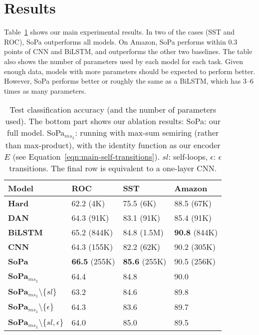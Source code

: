 \documentclass[11pt,a4paper]{article}
\newcommand{\isectionb}[1]{\section{#1}\label{sec:#1}}
\newcommand{\tabref}[1]{Table~\ref{#1}}
\newcommand{\SoftP}{SoPa\xspace}
\newcommand{\Softp}{SoPa}
\begin{document}
\isectionb{Results}



\tabref{tab:results} shows our main experimental results. 
In two of the cases (SST and ROC), \SoftP outperforms all models.
On Amazon, \SoftP performs within 0.3 points of CNN and BiLSTM, and outperforms the other two baselines.
The table also shows the number of parameters used by each model for each task. 
Given enough data, models with more parameters should be expected to perform better.
However, \SoftP performs better or roughly the same as a BiLSTM, which has  $3$--$6$ times as many parameters.

  









\begin{table}[!t]

\setlength{\tabcolsep}{1.7pt}
\small
\centering
\begin{tabularx}{\linewidth}{@{}l X X X  @{}}
  \toprule
  {\bf Model} & {\bf ROC} & {\bf SST} & {\bf Amazon}   \\
  \midrule
  {\bf Hard} & 62.2 (4K) & 75.5 (6K) & 88.5 (67K)   \\
  {\bf DAN} & 64.3 (91K)& 83.1 (91K) & 85.4 (91K) \\
  {\bf BiLSTM} & 65.2 (844K)& 84.8 (1.5M) & {\bf 90.8} (844K) \\
  {\bf CNN} & 64.3 (155K) & 82.2  (62K) & 90.2 (305K) \\
  \midrule
  {\bf \SoftP} & {\bf 66.5} (255K)& {\bf 85.6} (255K) & 90.5 (256K)  \\
  \midrule
    {\bf \Softp$_{ms_\mathds{1}}$} & 64.4 & 84.8 & 90.0 \\
  {\bf \Softp$_{ms_\mathds{1}}\setminus$$\{sl\}$} & 63.2 & 84.6 & 89.8  \\
  {\bf \Softp$_{ms_\mathds{1}}\setminus$$\{\epsilon\}$} & 64.3 & 83.6 & 89.7 \\
  {\bf \Softp$_{ms_\mathds{1}}\setminus$$\{sl,\epsilon\}$} & 64.0 & 85.0 & 89.5\\


  \bottomrule
\end{tabularx}
\caption{\label{tab:results} Test classification accuracy (and the number of parameters used).
The bottom part shows our ablation results:  \SoftP{}: our full model. 
\Softp$_{ms_\mathds{1}}$: running with max-sum semiring (rather than max-product), with the identity function as our encoder $E$ (see Equation~\ref{eqn:main-self-transitions}).
$sl$: self-loops, $\epsilon$: $\epsilon$ transitions.
The final row is equivalent to a one-layer CNN.}
\end{table}
\end{document}
